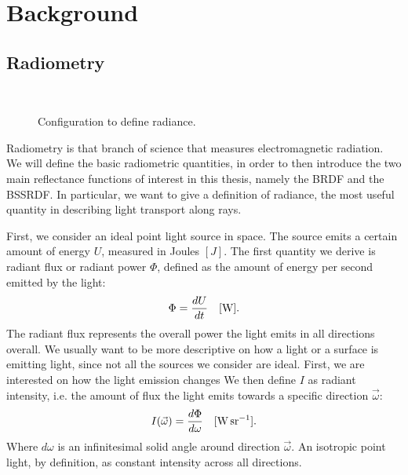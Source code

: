 \chapter{Background}
\label{sec:background}

\section{Radiometry}
\begin{figure}
\centering
   \def\svgwidth{0.4\textwidth}
    \\
\caption{Configuration to define radiance.} %
\label{fig:radiance}
\end{figure}
Radiometry is that branch of science that measures electromagnetic radiation. We will define the basic radiometric quantities, in order to then introduce the two main reflectance functions of interest in this thesis, namely the BRDF and the BSSRDF. In particular, we want to give a definition of radiance, the most useful quantity in describing light transport along rays.

First, we consider an ideal point light source in space. The source emits a certain amount of energy $U$, measured in Joules $[J]$. The first quantity we derive is radiant flux or radiant power $\Phi$, defined as the amount of energy per second emitted by the light:
\begin{equation*}
\Phi = \frac{d U}{d t}  \ \ \ [\SI{}{\watt}].
\end{equation*}
The radiant flux represents the overall power the light emits in all directions overall. We usually want to be more descriptive on how a light or a surface is emitting light, since not all the sources we consider are ideal. First, we are interested on how the light emission changes  We then define $I$ as radiant intensity, i.e. the amount of flux the light emits towards a specific direction $\vec{\omega}$:
\begin{equation*}
I(\vec{\omega}) = \frac{d \Phi}{d \omega}  \siunit{\watt \per \steradian}.
\end{equation*}   
Where $d \omega$ is an infinitesimal solid angle around direction $\vec{\omega}$. An isotropic point light, by definition, as constant intensity across all directions.

